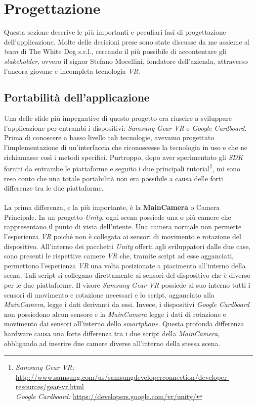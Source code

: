 \section{Progettazione}

Questa sezione descrive le più importanti e peculiari fasi di progettazione dell'applicazione. Molte delle decisioni prese sono state discusse da me assieme al \textit{team} di The White Dog s.r.l., cercando il più possibile di accontentare gli \textit{stakeholder}\hyperlink{sh}{}, ovvero il signor Stefano Mocellini, fondatore dell'azienda, attraverso l'ancora giovane e incompleta tecnologia \textit{VR}.

\subsection{Portabilità dell'applicazione}

Una delle sfide più impegnative di questo progetto era riuscire a sviluppare l'applicazione per entrambi i dispositivi: \textit{Samsung Gear VR} e \textit{Google Cardboard}. Prima di conoscere a basso livello tali tecnologie, avevamo progettato l'implementazione di un'interfaccia che riconoscesse la tecnologia in uso e che ne richiamasse così i metodi specifici. Purtroppo, dopo aver sperimentato gli \textit{SDK} forniti da entrambe le piattaforme e seguito i due principali tutorial\footnote[1]{\textit{Samsung Gear VR:} \url{http://www.samsung.com/us/samsungdeveloperconnection/developer-resources/gear-vr.html} \\ \textit{Google Cardboard:} \url{https://developers.google.com/vr/unity/}}, mi sono reso conto che una totale portabilità non era possibile a causa delle forti differenze tra le due piattaforme. \\ \\
La prima differenza, e la più importante, è la \textbf{MainCamera} o Camera Principale. In un progetto \textit{Unity}, ogni scena possiede una o più camere che rappresentano il punto di vista dell'utente. Una camera normale non permette l'esperienza \textit{VR} poiché non è collegata ai sensori di movimento e rotazione del dispositivo. All'interno dei pacchetti \textit{Unity} offerti agli sviluppatori dalle due case, sono presenti le rispettive camere \textit{VR} che, tramite script ad esse agganciati, permettono l'esperienza \textit{VR} una volta posizionate a piacimento all'interno della scena. Tali script si collegano direttamente ai sensori del dispositivo che è diverso per le due piattaforme. Il visore \textit{Samsung Gear VR} possiede al suo interno tutti i sensori di movimento e rotazione necessari e lo script, agganciato alla \textit{MainCamera}, legge i dati derivanti da essi. Invece, i dispositivi \textit{Google Cardboard} non possiedono alcun sensore e la \textit{MainCamera} legge i dati di rotazione e movimento dai sensori all'interno dello \textit{smartphone}. Questa profonda differenza hardware causa una forte differenza tra i due script della \textit{MainCamera}, obbligando ad inserire due camere diverse all'interno della stessa scena.

